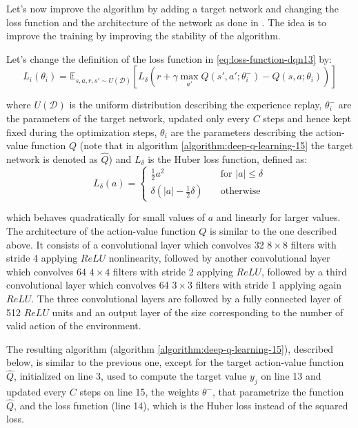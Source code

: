\documentclass[a4paper]{article}
\numberwithin{equation}{section} %
\numberwithin{figure}{section} %
\numberwithin{table}{section} %
\theoremstyle{definition}
\begin{document}
Let's now improve the algorithm by adding a target network and changing the loss
function and the architecture of the network as done in \cite{mnih2015humanlevel}.
The idea is to improve the training by improving the stability of the algorithm.

Let's change the definition of the loss function in \ref{eq:loss-function-dqn13}
by:
\begin{equation*}
	L_i(\theta_i) = \mathbb{E}_{s, a, r, s' \sim U(\mathcal{D})} \left[ L_{\delta}\left( r + \gamma \max_{a'} Q(s', a'; \theta_i^-) - Q(s, a; \theta_i) \right) \right]
\end{equation*}

\noindent where $U(\mathcal{D})$ is the uniform distribution describing the
experience replay, $\theta_i^-$ are the parameters of the target network, updated
only every $C$ steps and hence kept fixed during the optimization steps,
$\theta_i$ are the parameters describing the action-value function $Q$ (note that
in algorithm \ref{algorithm:deep-q-learning-15} the target network is denoted
as $\hat{Q}$) and $L_{\delta}$ is the Huber loss function, defined as:
\begin{equation*}
	L_{\delta}(a) =
		\begin{cases}
		 \frac{1}{2}a^2 & \quad \text{for } |a| \le \delta \\
		 \delta \left( |a| - \frac{1}{2}\delta \right) & \quad \text{otherwise}
		\end{cases}
\end{equation*}

\noindent which behaves quadratically for small values of $a$ and linearly for
larger values. The architecture of the action-value function $Q$ is similar to
the one described above. It consists of a convolutional layer which convolves
32 $8 \times 8$ filters with stride 4 applying $ReLU$ nonlinearity, followed by
another convolutional layer which convolves 64 $4 \times 4$ filters with stride
2 applying $ReLU$, followed by a third convolutional layer which convolves
64 $3 \times 3$ filters with stride 1 applying again $ReLU$. The three convolutional
layers are followed by a fully connected layer of 512 $ReLU$ units and an output
layer of the size corresponding to the number of valid action of the environment.

The resulting algorithm (algorithm \ref{algorithm:deep-q-learning-15}), described below,
is similar to the previous one, except for the target action-value function $\hat{Q}$,
initialized on line 3, used to compute the target value $y_j$ on line 13 and updated
every $C$ steps on line 15, the weights $\theta^-$, that parametrize the function $\hat{Q}$,
and the loss function (line 14), which is the Huber loss instead of the squared
loss.
\end{document}
